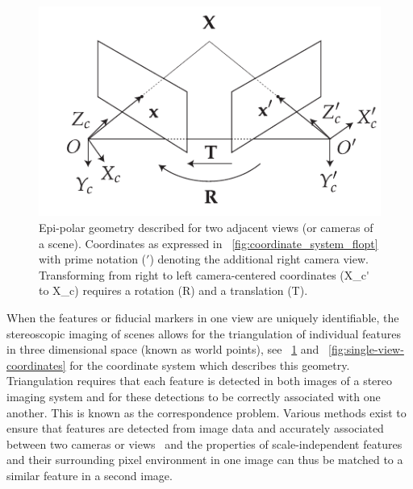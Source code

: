 \documentclass{osa-article}
\begin{document}
\begin{figure}
  \centering
  \includegraphics{./figures/epi-polar-geom}
  \caption[Epi-polar geometry described for two adjacent views]{
    Epi-polar geometry described for two adjacent views (or cameras of a scene).
    Coordinates as expressed in \figurename~\ref{fig:coordinate_system_flopt} with prime notation (\('\)) denoting the additional right camera view.
    Transforming from right to left camera-centered coordinates (\gls*{X_c'} to \gls*{X_c}) requires a rotation (\gls*{R}) and a translation (\gls*{T}).
  }\label{fig:epi-polar-geom}
\end{figure}




When the features or fiducial markers in one view are uniquely identifiable, the stereoscopic imaging of scenes allows for the triangulation of individual features in three dimensional space (known as world points), see \figurename~\ref{fig:epi-polar-geom} and \figurename~\ref{fig:single-view-coordinates} for the coordinate system which describes this geometry. %
Triangulation requires that each feature is detected in both images of a stereo imaging system and for these detections to be correctly associated with one another.
This is known as the correspondence problem.
Various methods exist to ensure that features are detected from image data and accurately associated between two cameras or views~\cite{szeliskiComputerVisionAlgorithms2010} and the properties of scale-independent features and their surrounding pixel environment in one image can thus be matched to a similar feature in a second image.
\end{document}
